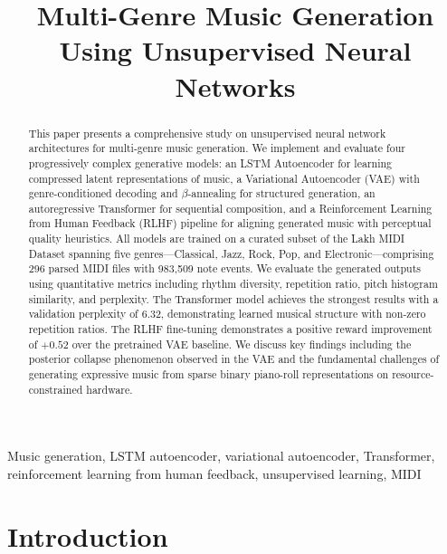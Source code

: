 \documentclass[conference]{IEEEtran}
\begin{document}
\title{Multi-Genre Music Generation Using Unsupervised Neural Networks}

\author{
}

\maketitle

\begin{abstract}
This paper presents a comprehensive study on unsupervised neural network architectures for multi-genre music generation. We implement and evaluate four progressively complex generative models: an LSTM Autoencoder for learning compressed latent representations of music, a Variational Autoencoder (VAE) with genre-conditioned decoding and $\beta$-annealing for structured generation, an autoregressive Transformer for sequential composition, and a Reinforcement Learning from Human Feedback (RLHF) pipeline for aligning generated music with perceptual quality heuristics. All models are trained on a curated subset of the Lakh MIDI Dataset spanning five genres---Classical, Jazz, Rock, Pop, and Electronic---comprising 296 parsed MIDI files with 983,509 note events. We evaluate the generated outputs using quantitative metrics including rhythm diversity, repetition ratio, pitch histogram similarity, and perplexity. The Transformer model achieves the strongest results with a validation perplexity of 6.32, demonstrating learned musical structure with non-zero repetition ratios. The RLHF fine-tuning demonstrates a positive reward improvement of $+0.52$ over the pretrained VAE baseline. We discuss key findings including the posterior collapse phenomenon observed in the VAE and the fundamental challenges of generating expressive music from sparse binary piano-roll representations on resource-constrained hardware.
\end{abstract}

\begin{IEEEkeywords}
Music generation, LSTM autoencoder, variational autoencoder, Transformer, reinforcement learning from human feedback, unsupervised learning, MIDI
\end{IEEEkeywords}

\section{Introduction}
\end{document}
